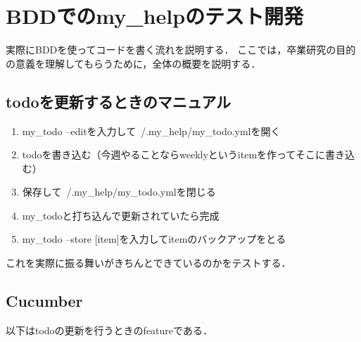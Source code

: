 
\section{BDDでのmy\_helpのテスト開発}
実際にBDDを使ってコードを書く流れを説明する．
ここでは，卒業研究の目的の意義を理解してもらうために，全体の概要を説明する．

\subsection{todoを更新するときのマニュアル}
\begin{enumerate}
\item my\_todo --editを入力して~/.my\_help/my\_todo.ymlを開く
\item todoを書き込む（今週やることならweeklyというitemを作ってそこに書き込む）
\item 保存して~/.my\_help/my\_todo.ymlを閉じる
\item my\_todoと打ち込んで更新されていたら完成
\item my\_todo --store [item]を入力してitemのバックアップをとる
\end{enumerate}
これを実際に振る舞いがきちんとできているのかをテストする．

\subsection{Cucumber}
以下はtodoの更新を行うときのfeatureである．

